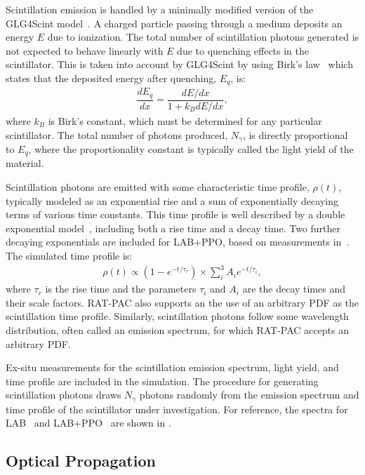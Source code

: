 Scintillation emission is handled by a minimally modified version of the GLG4Scint model~\cite{glg4sim}. 
A charged particle passing through a medium deposits an energy $E$ due to ionization. 
The total number of scintillation photons generated is not expected to behave linearly with $E$ due to quenching effects in the scintillator.
This is taken into account by GLG4Scint by using Birk's law~\cite{birks} which states that the deposited energy after quenching, $E_{q}$, is:
\begin{eqnarray}
	\dfrac{dE_{q}}{dx} = \dfrac{dE/dx}{1+ k_BdE/dx},
    \label{eq:birk}
\end{eqnarray}
where $k_B$ is Birk's constant, which must be determined for any particular scintillator. 
The total number of  photons produced, $N_{\gamma}$, is directly proportional to $E_{q}$, where the proportionality constant is typically called the light yield of the material. 

Scintillation photons are emitted with some characteristic time profile, $\rho(t)$, typically modeled as an exponential rise and a sum of exponentially decaying terms of various time constants.
This time profile is well described by a double exponential model~\cite{mcguire_palmer}, including both a rise time and a decay time. 
Two further decaying exponentials are included for LAB+PPO, based on measurements in~\cite{labppo}. The simulated time profile is:
\begin{eqnarray}
\rho(t) \propto (1 - e^{-t/\tau_r}) \times \sum^3_i A_i e^{-t/\tau_i},
\end{eqnarray}
where $\tau_r$ is the rise time and the parameters $\tau_i$ and $A_i$ are the decay times and their scale factors.
RAT-PAC also supports an the use of an arbitrary PDF as the scintillation time profile.
Similarly, scintillation photons follow some wavelength distribution, often called an emission spectrum, for which RAT-PAC accepts an arbitrary PDF.

Ex-situ measurements for the scintillation emission spectrum, light yield, and time profile are included in the simulation. 
The procedure for generating scintillation photons draws $N_{\gamma}$ photons randomly from the emission spectrum and time profile of the scintillator under investigation. 
For reference, the spectra for LAB~\cite{lab_emission} and LAB+PPO~\cite{snop_private} are shown in . 


\subsection{Optical Propagation \label{sec:optics}}

